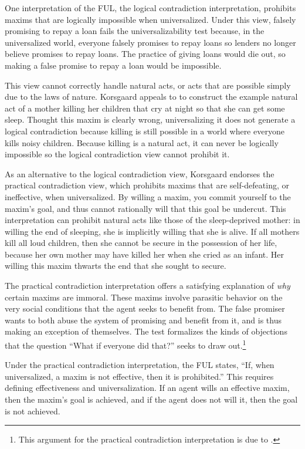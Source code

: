 \begin{isabellebody}
\begin{isamarkuptext}
One interpretation of the FUL, the logical contradiction interpretation, prohibits maxims that are 
logically impossible when universalized. Under this view, falsely promising to repay a loan fails the 
universalizability test because, in the universalized world, everyone falsely promises to repay
loans so lenders no longer believe promises to repay loans. The practice of giving loans would die out, so 
making a false promise to repay a loan would be impossible.

This view cannot correctly handle natural acts, or acts that are possible simply due to the laws of nature. Korsgaard appeals to 
\citet{dietrichson} to construct the example natural act of a mother killing her children that
cry at night so that she can get some sleep. Thought this maxim is clearly wrong, universalizing 
it does not generate a logical contradiction because killing is still possible in a world where 
everyone kills noisy children. Because killing is a natural act, it can never be logically 
impossible so the logical contradiction view cannot prohibit it.

As an alternative to the logical contradiction view, Korsgaard endorses the practical contradiction view, 
which prohibits maxims that are self-defeating, or ineffective, when universalized. By willing a maxim, 
you commit yourself to the maxim's goal, and thus cannot rationally will that this goal be 
undercut. This interpretation can prohibit natural acts like those of the sleep-deprived mother: in 
willing the end of sleeping, she is implicitly willing that she is alive. If all mothers kill all 
loud children, then she cannot be secure in the possession of her life, because her own mother may 
have killed her when she cried as an infant. Her willing this maxim thwarts the end that she sought to secure. 

The practical contradiction interpretation offers a satisfying explanation of \emph{why} certain 
maxims are immoral. These maxims involve parasitic behavior on the very social conditions that the agent seeks 
to benefit from. The false promiser wants to both abuse the system of promising and benefit 
from it, and is thus making an exception of themselves. The test formalizes the kinds of objections 
that the question ``What if everyone did that?'' seeks to draw out.\footnote{This argument for the practical
contradiction interpretation is due to \citet{KorsgaardFUL}.}

Under the practical contradiction interpretation, the FUL states, ``If, when universalized, a maxim is 
not effective, then it is prohibited.'' This requires defining effectiveness and universalization. 
If an agent wills an effective maxim, then the maxim's goal is achieved, and if the agent does 
not will it, then the goal is not achieved. 


\end{isamarkuptext}
\end{isabellebody}
